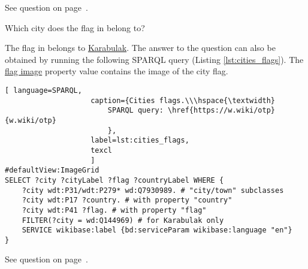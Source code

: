 See question on page~\pageref{question:cities_over_400_age}.

\begin{exercise}%
    \label{answer:cities_flags}
Which city does the flag in  belong to?
\end{exercise}

The flag in  belongs to \href{https://w.wiki/qqN}{Karabulak}. The answer to the question can also be obtained by running the following SPARQL query (Listing \ref{lst:cities_flags}). The \href{https://www.wikidata.org/wiki/Property:P41}{flag image} property value contains the image of the city flag.

\begin{lstlisting}[ language=SPARQL, 
                    caption={Cities flags.\\\hspace{\textwidth}
                        SPARQL query: \href{https://w.wiki/otp}{w.wiki/otp}
                        },
                    label=lst:cities_flags,
                    texcl 
                    ]
#defaultView:ImageGrid
SELECT ?city ?cityLabel ?flag ?countryLabel WHERE {
	?city wdt:P31/wdt:P279* wd:Q7930989. # "city/town" subclasses
	?city wdt:P17 ?country. # with property "country"
	?city wdt:P41 ?flag. # with property "flag"
	FILTER(?city = wd:Q144969) # for Karabulak only
	SERVICE wikibase:label {bd:serviceParam wikibase:language "en"}
}
\end{lstlisting}%

See question on page~\pageref{question:cities_flags}.

